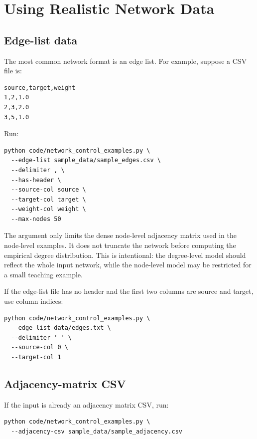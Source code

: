 \documentclass[11pt,a4paper]{article}
\DeclareRobustCommand{\code}[1]{\texttt{\detokenize{#1}}}
\begin{document}
\section{Using Realistic Network Data}

\subsection{Edge-list data}

The most common network format is an edge list. For example, suppose a CSV file is:

\begin{lstlisting}[style=text]
source,target,weight
1,2,1.0
2,3,2.0
3,5,1.0
\end{lstlisting}

Run:

\begin{lstlisting}[style=bash]
python code/network_control_examples.py \
  --edge-list sample_data/sample_edges.csv \
  --delimiter , \
  --has-header \
  --source-col source \
  --target-col target \
  --weight-col weight \
  --max-nodes 50
\end{lstlisting}

The argument \code{--max-nodes 50} only limits the dense node-level adjacency matrix used in the node-level examples. It does not truncate the network before computing the empirical degree distribution. This is intentional: the degree-level model should reflect the whole input network, while the node-level model may be restricted for a small teaching example.

If the edge-list file has no header and the first two columns are source and target, use column indices:

\begin{lstlisting}[style=bash]
python code/network_control_examples.py \
  --edge-list data/edges.txt \
  --delimiter ' ' \
  --source-col 0 \
  --target-col 1
\end{lstlisting}

\subsection{Adjacency-matrix CSV}

If the input is already an adjacency matrix CSV, run:

\begin{lstlisting}[style=bash]
python code/network_control_examples.py \
  --adjacency-csv sample_data/sample_adjacency.csv
\end{lstlisting}
\end{document}
